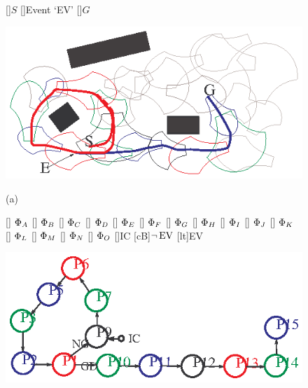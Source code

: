 \begin{figure}[bt]%
  \centering 
\begin{minipage}{0.85\linewidth}
  \centering 
{}[]{$S$}
[]{Event `EV'}
[]{$G$}

  \includegraphics[width=\linewidth]{graphics/automaton2D.eps} 

{\footnotesize (a)}
\end{minipage}

\begin{minipage}{0.85\linewidth}
  \centering 
{}[]{\textcolor{red}{ $\Phi_A$}}
[]{\textcolor{blue}{ $\Phi_B$}}
[]{\textcolor{DarkGreen}{ $\Phi_C$}}
[]{\textcolor{black}{ $\Phi_D$}}
[]{\textcolor{blue}{ $\Phi_E$}}
[]{\textcolor{red}{ $\Phi_F$}}
[]{\textcolor{DarkGreen}{ $\Phi_G$}}
[]{\textcolor{blue}{ $\Phi_H$}}
[]{\textcolor{black}{ $\Phi_I$}}
[]{\textcolor{DarkGreen}{ $\Phi_J$}}
[]{\textcolor{blue}{ $\Phi_K$}}
[]{\textcolor{black}{ $\Phi_L$}}
[]{\textcolor{red}{ $\Phi_M$}}
[]{\textcolor{DarkGreen}{ $\Phi_N$}}
[]{\textcolor{blue}{ $\Phi_O$}}
[]{IC}
[cB]{$\neg\,\mathrm{ EV }$}
[lt]{EV}

  \includegraphics[width=\linewidth]{graphics/automatonGraph.eps} 


\end{minipage}
\end{figure}
